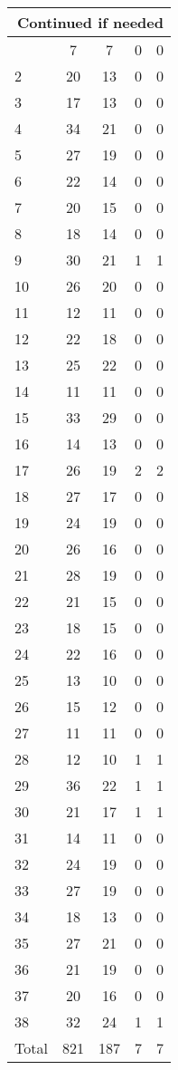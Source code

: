 \begin{center}
\begin{longtable}{l|c|c|c|c}
\hline \multicolumn{5}{|r|}{{Continued if needed}} \\ \hline
\endfoot 
1 & 7 & 7 & 0 & 0\\ \hline
2 & 20 & 13 & 0 & 0\\ \hline
3 & 17 & 13 & 0 & 0\\ \hline
4 & 34 & 21 & 0 & 0\\ \hline
5 & 27 & 19 & 0 & 0\\ \hline
6 & 22 & 14 & 0 & 0\\ \hline
7 & 20 & 15 & 0 & 0\\ \hline
8 & 18 & 14 & 0 & 0\\ \hline
9 & 30 & 21 & 1 & 1\\ \hline
10 & 26 & 20 & 0 & 0\\ \hline
11 & 12 & 11 & 0 & 0\\ \hline
12 & 22 & 18 & 0 & 0\\ \hline
13 & 25 & 22 & 0 & 0\\ \hline
14 & 11 & 11 & 0 & 0\\ \hline
15 & 33 & 29 & 0 & 0\\ \hline
16 & 14 & 13 & 0 & 0\\ \hline
17 & 26 & 19 & 2 & 2\\ \hline
18 & 27 & 17 & 0 & 0\\ \hline
19 & 24 & 19 & 0 & 0\\ \hline
20 & 26 & 16 & 0 & 0\\ \hline
21 & 28 & 19 & 0 & 0\\ \hline
22 & 21 & 15 & 0 & 0\\ \hline
23 & 18 & 15 & 0 & 0\\ \hline
24 & 22 & 16 & 0 & 0\\ \hline
25 & 13 & 10 & 0 & 0\\ \hline
26 & 15 & 12 & 0 & 0\\ \hline
27 & 11 & 11 & 0 & 0\\ \hline
28 & 12 & 10 & 1 & 1\\ \hline
29 & 36 & 22 & 1 & 1\\ \hline
30 & 21 & 17 & 1 & 1\\ \hline
31 & 14 & 11 & 0 & 0\\ \hline
32 & 24 & 19 & 0 & 0\\ \hline
33 & 27 & 19 & 0 & 0\\ \hline
34 & 18 & 13 & 0 & 0\\ \hline
35 & 27 & 21 & 0 & 0\\ \hline
36 & 21 & 19 & 0 & 0\\ \hline
37 & 20 & 16 & 0 & 0\\ \hline
38 & 32 & 24 & 1 & 1\\ \hline
\hline \hline
Total & 821 & 187 & 7 & 7



\end{longtable}
\end{center}

